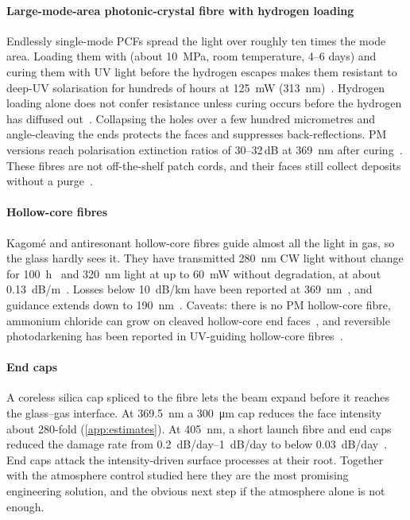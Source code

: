 \paragraph{Large-mode-area photonic-crystal fibre with hydrogen loading} Endlessly single-mode PCFs
spread the light over roughly ten times the mode area. Loading them with \Htwo{} (about \SI{10}{MPa},
room temperature, 4--6 days) and curing them with UV light before the hydrogen escapes makes them resistant
to deep-UV solarisation for hundreds of hours at \SI{125}{mW} (\SI{313}{nm})~\cite{Colombe2014,NISTrecipe}.
Hydrogen loading alone does not confer resistance unless curing occurs before the hydrogen has diffused
out~\cite{Colombe2014}. Collapsing the holes over a few hundred micrometres and angle-cleaving the ends
protects the faces and suppresses back-reflections. PM versions reach polarisation extinction ratios of
30--32\,dB at \SI{369}{nm} after curing~\cite{Marciniak2017}. These fibres are not off-the-shelf
patch cords, and their faces still collect deposits without a purge~\cite{Marciniak2017}.

\paragraph{Hollow-core fibres} Kagom\'e and antiresonant hollow-core fibres guide almost all the light in
gas, so the glass hardly sees it. They have transmitted \SI{280}{nm} CW light without change for
\SI{100}{h}~\cite{Gebert2014} and \SI{320}{nm} light at up to \SI{60}{mW} without degradation, at about
\SI{0.13}{dB/m}~\cite{Dorer2024}. Losses below \SI{10}{dB/km} have been reported at
\SI{369}{nm}~\cite{Osorio2023}, and guidance extends down to \SI{190}{nm}~\cite{Mears2024}. Caveats:
there is no PM hollow-core fibre, ammonium chloride can grow on cleaved hollow-core end
faces~\cite{Rikimi2020}, and reversible photodarkening has been reported in UV-guiding hollow-core
fibres~\cite{Mears2024SPIE}.

\paragraph{End caps} A coreless silica cap spliced to the fibre lets the beam expand before it reaches the
glass--gas interface. At \SI{369.5}{nm} a \SI{300}{\micro m} cap reduces the face intensity about
280-fold (\cref{app:estimates}). At \SI{405}{nm}, a short launch fibre and end caps reduced the
damage rate from \SIrange{0.2}{1}{dB/day} to below \SI{0.03}{dB/day}~\cite{Gonschior2013PhD}. End caps
attack the intensity-driven surface processes at their root. Together with the atmosphere control
studied here they are the most promising engineering solution, and the obvious next step if the
atmosphere alone is not enough.

